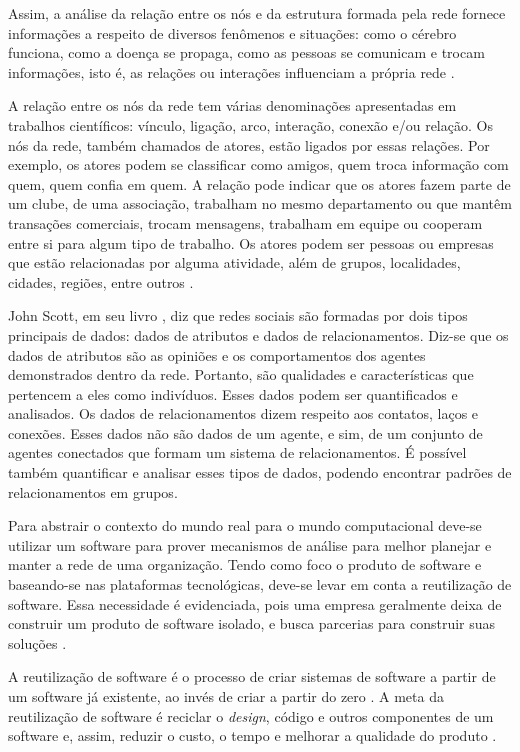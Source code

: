 Assim, a análise da relação entre os nós e da estrutura formada pela rede fornece informações a respeito de diversos fenômenos e situações: como o cérebro funciona, como a doença se propaga, como as pessoas se comunicam e trocam informações, isto é, as relações ou interações influenciam a própria rede \cite{Goular:2014}.

A relação entre os nós da rede tem várias denominações apresentadas em trabalhos científicos: vínculo, ligação, arco, interação, conexão e/ou relação. Os nós da rede, também chamados de atores, estão ligados por essas relações. Por exemplo, os atores podem se classificar como amigos, quem troca informação com quem, quem confia em quem. A relação pode indicar que os atores fazem parte de um clube, de uma associação, trabalham no mesmo departamento ou que mantêm transações comerciais, trocam mensagens, trabalham em equipe ou cooperam entre si para algum tipo de trabalho. Os atores podem ser pessoas ou empresas que estão relacionadas por alguma atividade, além de grupos, localidades, cidades, regiões, entre outros \cite{Hanneman:Riddle:2005}.

John Scott, em seu livro \cite{Scott:Carrington:2011}, diz que redes sociais são formadas por dois tipos principais de dados: dados de atributos e dados de relacionamentos. Diz-se que os dados de atributos são as opiniões e os comportamentos dos agentes demonstrados dentro da rede. Portanto, são qualidades e características que pertencem a eles como indivíduos. Esses dados podem ser quantificados e analisados. Os dados de relacionamentos dizem respeito aos contatos, laços e conexões. Esses dados não são dados de um agente, e sim, de um conjunto de agentes conectados que formam um sistema de relacionamentos. É possível também quantificar e analisar esses tipos de dados, podendo encontrar padrões de relacionamentos em grupos.

Para abstrair o contexto do mundo real para o mundo computacional deve-se utilizar um software para prover mecanismos de análise para melhor planejar e manter a rede de uma organização. Tendo como foco o produto de software e baseando-se nas plataformas tecnológicas, deve-se levar em conta a reutilização de software. Essa necessidade é evidenciada, pois uma empresa geralmente deixa de construir um produto de software isolado, e busca parcerias para construir suas soluções \cite{Lima:2015}.

A reutilização de software é o processo de criar sistemas de software a partir de um software já existente, ao invés de criar a partir do zero \cite{Krueger:1992}. A meta da reutilização de software é reciclar o \textit{design}, código e outros componentes de um software e, assim, reduzir o custo, o tempo e melhorar a qualidade do produto \cite{Keswani:Joshi:Jatain:2014}.

